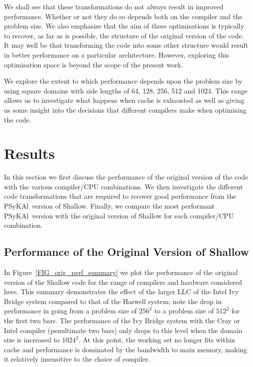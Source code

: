 \documentclass{IOS-Book-Article}
\newcommand{\psykal}{{PS}y{KA}l}
\begin{document}
We shall see that these transformations do not always result in
improved performance. Whether or not they do so depends both on the
compiler and the problem size. We also emphasise that the aim of these
optimisations is typically to recover, as far as is possible, the
structure of the original version of the code. It may well be that
transforming the code into some other structure would result in better
performance on a particular architecture. However, exploring this
optimisation space is beyond the scope of the present work.

We explore the extent to which performance depends upon the problem
size by using square domains with side lengths of 64, 128, 256, 512 and
1024. This range allows us to investigate what happens when cache is
exhausted as well as giving us some insight into the decisions that
different compilers make when optimising the code.

\section{Results}

In this section we first discuss the performance of the original
version of the code with the various compiler/CPU combinations. We
then investigate the different code transformations that are required
to recover good performance from the \psykal\ version of Shallow. Finally,
we compare the most performant \psykal\ version  with the original
version of Shallow for each compiler/CPU combination.

\subsection{Performance of the Original Version of Shallow}

In Figure~\ref{FIG_orig_perf_summary} we plot the performance of the
original version of the Shallow code for the range of compilers and
hardware considered here. This summary demonstrates the effect of the
larger LLC of the Intel Ivy Bridge system compared to
that of the Haswell system; note the drop in performance
in going from a problem size of $256^{2}$ to a problem size of
$512^{2}$ for the first two bars. The performance of the Ivy
Bridge system with the Cray or Intel compiler (penultimate two bars)
only drops to this level when the domain size is increased to
$1024^{2}$. At this point, the working set no longer fits within cache
and performance is dominated by the bandwidth to main memory, making
it relatively insensitive to the choice of compiler.
\end{document}
